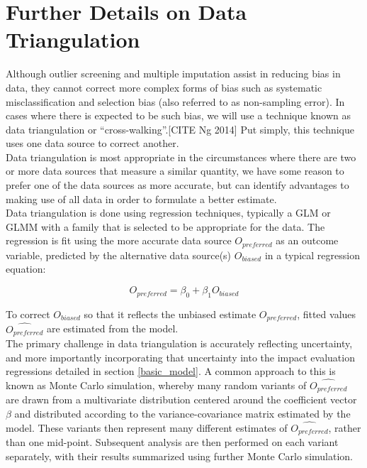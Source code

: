 \documentclass[twocolumn]{bmcart}%
\begin{document}
\section{Further Details on Data Triangulation} \label{triangulation}
Although outlier screening and multiple imputation assist in reducing bias in data, they cannot correct more complex forms of bias such as systematic misclassification and selection bias (also referred to as non-sampling error). In cases where there is expected to be such bias, we will use a technique known as data triangulation or ``cross-walking''.[CITE Ng 2014] Put simply, this technique uses one data source to correct another. \\

Data triangulation is most appropriate in the circumstances where there are two or more data sources that measure a similar quantity, we have some reason to prefer one of the data sources as more accurate, but can identify advantages to making use of all data in order to formulate a better estimate. \\

Data triangulation is done using regression techniques, typically a GLM or GLMM with a family that is selected to be appropriate for the data. The regression is fit using the more accurate data source $O_{preferred}$ as an outcome variable, predicted by the alternative data source(s) $O_{biased}$ in a typical regression equation:

\begin{equation}
  O_{preferred}=\beta_0 + \beta_1 O_{biased}
\end{equation}

To correct $O_{biased}$ so that it reflects the unbiased estimate $O_{preferred}$, fitted values $\widehat{O_{preferred}}$ are estimated from the model. \\

The primary challenge in data triangulation is accurately reflecting uncertainty, and more importantly incorporating that uncertainty into the impact evaluation regressions detailed in section \ref{basic_model}. A common approach to this is known as Monte Carlo simulation, whereby many random variants of $\widehat{O_{preferred}}$ are drawn from a multivariate distribution centered around the coefficient vector $\beta$ and distributed according to the variance-covariance matrix estimated by the model. These variants then represent many different estimates of $\widehat{O_{preferred}}$, rather than one mid-point. Subsequent analysis are then performed on each variant separately, with their results summarized using further Monte Carlo simulation. \\
\end{document}
